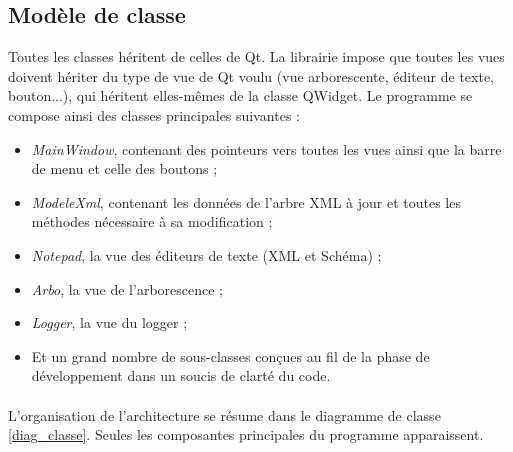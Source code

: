 \subsection{Modèle de classe}
Toutes les classes héritent de celles de Qt. La librairie impose que toutes les vues doivent hériter du type de vue de Qt voulu (vue arborescente, éditeur de texte, bouton...), qui héritent elles-mêmes de la classe QWidget.
Le programme se compose ainsi des classes principales suivantes :
\begin{itemize}
\item \emph{MainWindow}, contenant des pointeurs vers toutes les vues ainsi que la barre de menu et celle des boutons ;
\item \emph{ModeleXml}, contenant les données de l'arbre XML à jour et toutes les méthodes nécessaire à sa modification ;
\item \emph{Notepad}, la vue des éditeurs de texte (XML et Schéma) ;
\item \emph{Arbo}, la vue de l'arborescence ;
\item \emph{Logger}, la vue du logger ;
\item Et un grand nombre de sous-classes conçues au fil de la phase de développement dans un soucis de clarté du code.
\end{itemize}

\paragraph{}
L'organisation de l'architecture se résume dans le diagramme de classe \ref{diag_classe}. Seules les composantes principales du programme apparaissent.

